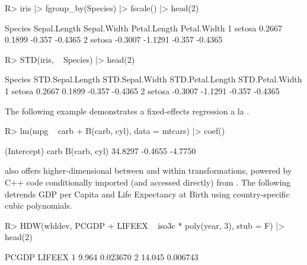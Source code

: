 \documentclass[article]{jss}
\begin{document}
\begin{Schunk}
\begin{Sinput}
R> iris |> fgroup_by(Species) |> fscale() |> head(2)
\end{Sinput}
\begin{Soutput}
  Species Sepal.Length Sepal.Width Petal.Length Petal.Width
1  setosa       0.2667      0.1899       -0.357     -0.4365
2  setosa      -0.3007     -1.1291       -0.357     -0.4365
\end{Soutput}
\begin{Sinput}
R> STD(iris, ~ Species) |> head(2)
\end{Sinput}
\begin{Soutput}
  Species STD.Sepal.Length STD.Sepal.Width STD.Petal.Length STD.Petal.Width
1  setosa           0.2667          0.1899           -0.357         -0.4365
2  setosa          -0.3007         -1.1291           -0.357         -0.4365
\end{Soutput}
\end{Schunk}
The following example demonstrates a fixed-effects regression a la \citet{mundlak1978pooling}.
\begin{Schunk}
\begin{Sinput}
R> lm(mpg ~ carb + B(carb, cyl), data = mtcars) |> coef()
\end{Sinput}
\begin{Soutput}
 (Intercept)         carb B(carb, cyl) 
     34.8297      -0.4655      -4.7750 
\end{Soutput}
\end{Schunk}
 also offers higher-dimensional between and within transformations, powered by C++ code conditionally imported (and accessed directly) from . The following detrends GDP per Capita and Life Expectancy at Birth using country-specific cubic polynomials.
\begin{Schunk}
\begin{Sinput}
R> HDW(wlddev, PCGDP + LIFEEX ~ iso3c * poly(year, 3), stub = F) |> head(2)
\end{Sinput}
\begin{Soutput}
   PCGDP   LIFEEX
1  9.964 0.023670
2 14.045 0.006743
\end{Soutput}
\end{Schunk}
%
\end{document}
